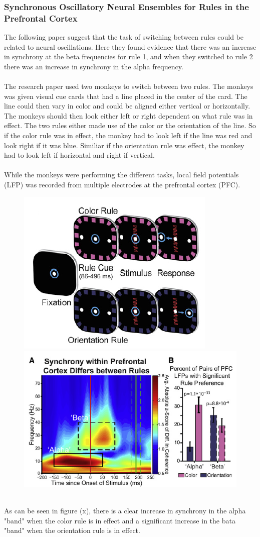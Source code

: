 \documentclass[11pt, a4paper]{article}
\begin{document}
\subsubsection{Synchronous Oscillatory Neural Ensembles
for Rules in the Prefrontal Cortex}
The following paper suggest that the task of switching between rules could be related to neural oscillations. Here they found evidence that there was an increase in synchrony at the beta frequencies for rule 1, and when they switched to rule 2 there was an increase in synchrony in the alpha frequency.
\\
\\
The research paper used two monkeys to switch between two rules. The monkeys was given visual cue cards that had a line placed in the center of the card. The line could then vary in color and could be aligned either vertical or horizontally. The monkeys should then look either left or right dependent on what rule was in effect. The two rules either made use of the color or the orientation of the line. So if the color rule was in effect, the monkey had to look left if the line was red and look right if it was blue. Similiar if the orientation rule was effect, the monkey had to look left if horizontal and right if vertical.
\\
\\
While the monkeys were performing the different tasks, local field potentials (LFP) was recorded from multiple electrodes at the prefrontal cortex (PFC).
\begin{figure}[!ht]
\centering
\includegraphics[scale=0.5]{MonkeyRules}
\includegraphics[scale=0.5]{MonkeyResults}
\caption{}
\end{figure}
\\
As can be seen in figure (x), there is a clear increase in synchrony in the alpha "band" when the color rule is in effect and a significant increase in the bata "band" when the orientation rule is in effect.
\end{document}
